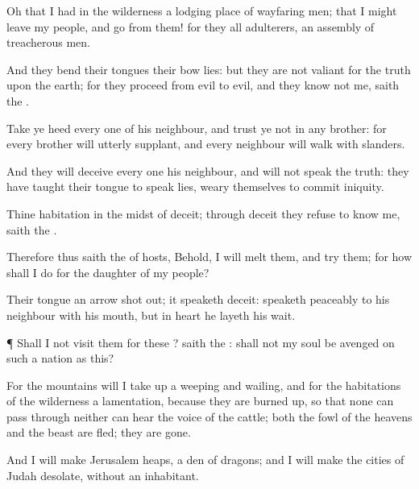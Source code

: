 {Oh
that I had in the
wilderness a lodging
place of wayfaring
men; that I might
leave my
people, and
go from them! for they
{} all
adulterers, an
assembly of treacherous
men.

And they
bend their
tongues
{} their
bow
{}
lies: but they are not
valiant for the
truth upon the
earth; for they
proceed from
evil to
evil, and they
know not me,
saith the
{}.

Take ye
heed every
one of his
neighbour, and
trust ye not in any
brother: for every
brother will
utterly
supplant, and every
neighbour will
walk with
slanders.

And they will
deceive every
one his
neighbour, and will not
speak the
truth: they have
taught their
tongue to
speak
lies,
{}
weary themselves to commit
iniquity.

Thine
habitation
{} in the
midst of
deceit; through
deceit they
refuse to
know me,
saith the
{}.

Therefore thus
saith the
{} of
hosts, Behold, I will
melt them, and
try them; for how shall I
do
for the
daughter of my
people?

Their
tongue
{} an
arrow shot
out; it
speaketh
deceit:
{}
speaketh
peaceably to his
neighbour with his
mouth, but in
heart he
layeth his
wait.


\par }{\PP {}¶ Shall I not
visit them for these
{}?
saith the
{}: shall not my
soul be
avenged on such a
nation as this?

For the
mountains will I take
up a
weeping and
wailing, and for the
habitations of the
wilderness a
lamentation, because they are burned
up, so that
none can
pass through
{} neither can
{}
hear the
voice of the
cattle; both the
fowl of the
heavens and the
beast are
fled; they are
gone.

And I will
make
Jerusalem
heaps,
{} a
den of
dragons; and I will
make the
cities of
Judah
desolate, without an
inhabitant.


}
